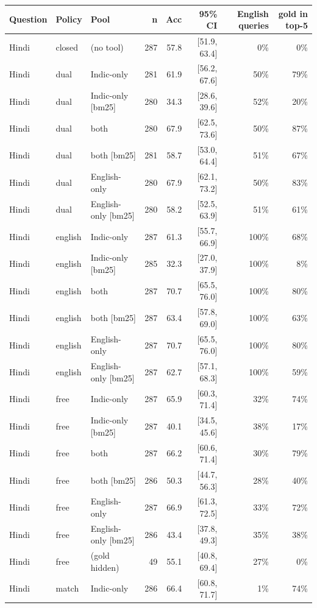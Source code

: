 \begin{table}[htbp]\centering\scriptsize
\begin{tabular}{lllrrrrr}
\toprule
Question & Policy & Pool & n & Acc & 95\% CI & English queries & gold in top-5 \\
\midrule
Hindi & closed & (no tool) & 287 & 57.8 & [51.9, 63.4] & 0\% & 0\% \\
Hindi & dual & Indic-only & 281 & 61.9 & [56.2, 67.6] & 50\% & 79\% \\
Hindi & dual & Indic-only [bm25] & 280 & 34.3 & [28.6, 39.6] & 52\% & 20\% \\
Hindi & dual & both & 280 & 67.9 & [62.5, 73.6] & 50\% & 87\% \\
Hindi & dual & both [bm25] & 281 & 58.7 & [53.0, 64.4] & 51\% & 67\% \\
Hindi & dual & English-only & 280 & 67.9 & [62.1, 73.2] & 50\% & 83\% \\
Hindi & dual & English-only [bm25] & 280 & 58.2 & [52.5, 63.9] & 51\% & 61\% \\
Hindi & english & Indic-only & 287 & 61.3 & [55.7, 66.9] & 100\% & 68\% \\
Hindi & english & Indic-only [bm25] & 285 & 32.3 & [27.0, 37.9] & 100\% & 8\% \\
Hindi & english & both & 287 & 70.7 & [65.5, 76.0] & 100\% & 80\% \\
Hindi & english & both [bm25] & 287 & 63.4 & [57.8, 69.0] & 100\% & 63\% \\
Hindi & english & English-only & 287 & 70.7 & [65.5, 76.0] & 100\% & 80\% \\
Hindi & english & English-only [bm25] & 287 & 62.7 & [57.1, 68.3] & 100\% & 59\% \\
Hindi & free & Indic-only & 287 & 65.9 & [60.3, 71.4] & 32\% & 74\% \\
Hindi & free & Indic-only [bm25] & 287 & 40.1 & [34.5, 45.6] & 38\% & 17\% \\
Hindi & free & both & 287 & 66.2 & [60.6, 71.4] & 30\% & 79\% \\
Hindi & free & both [bm25] & 286 & 50.3 & [44.7, 56.3] & 28\% & 40\% \\
Hindi & free & English-only & 287 & 66.9 & [61.3, 72.5] & 33\% & 72\% \\
Hindi & free & English-only [bm25] & 286 & 43.4 & [37.8, 49.3] & 35\% & 38\% \\
Hindi & free & (gold hidden) & 49 & 55.1 & [40.8, 69.4] & 27\% & 0\% \\
Hindi & match & Indic-only & 286 & 66.4 & [60.8, 71.7] & 1\% & 74\% \\

\end{tabular}
\end{table}
